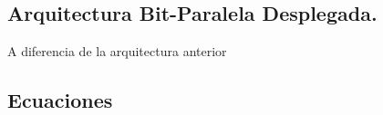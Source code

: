 \subsection{Arquitectura Bit-Paralela Desplegada.}


A diferencia de la arquitectura anterior


























\subsection{Ecuaciones}

